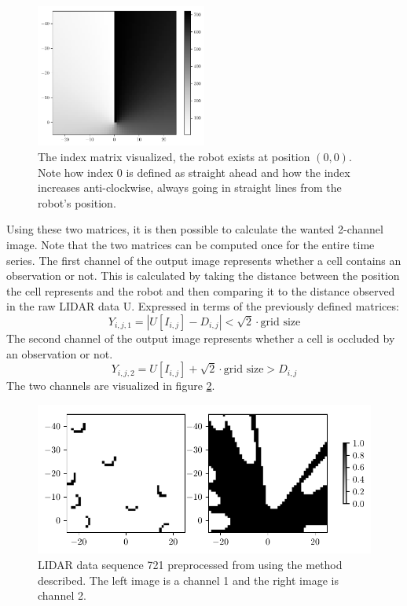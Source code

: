 \documentclass[a4paper]{article}
\begin{document}
\begin{figure}
  \begin{center}
    \includegraphics[width=0.5\textwidth]{figures/index_matrix}
  \end{center}
  \caption{
    The index matrix visualized, the robot exists at position $(0, 0)$.
    Note how index 0 is defined as straight ahead and how the index increases anti-clockwise, always going in straight lines from the robot's position.
    }
  \label{fig:index_matrix}
\end{figure}

Using these two matrices, it is then possible to calculate the wanted 2-channel image.
Note that the two matrices can be computed once for the entire time series.
The first channel of the output image represents whether a cell contains an observation or not.
This is calculated by taking the distance between the position the cell represents and the robot and then comparing it to the distance observed in the raw LIDAR data U.
Expressed in terms of the previously defined matrices:
\[
Y_{i, j, 1} = | U[I_{i, j}] - D_{i,j} | < \sqrt{2} \cdot \text{grid size}
\]
The second channel of the output image represents whether a cell is occluded by an observation or not.
\[
Y_{i, j, 2} = U[I_{i, j}] + \sqrt{2} \cdot \text{grid size} > D_{i, j}
\]
The two channels are visualized in figure \ref{fig:preprocessed_image}.

\begin{figure}
  \includegraphics[width=\textwidth]{figures/preprocessed_image}
  \caption{
    LIDAR data sequence 721 preprocessed from using the method described.
    The left image is a channel 1 and the right image is channel 2.
    }
  \label{fig:preprocessed_image}
\end{figure}
\end{document}
